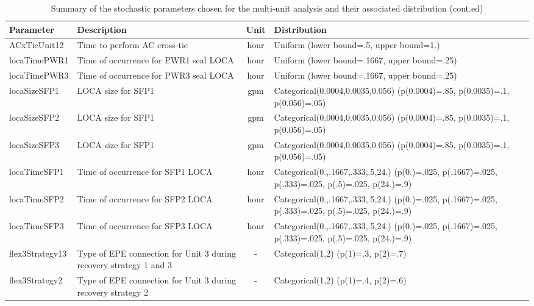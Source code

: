 \begin{table}
  \centering
  \begin{center}
      \begin{tabular}{ | l | p{5cm} | c | p{5cm} |}
        \hline
         \textbf{Parameter}          & \textbf{Description}                      & \textbf{Unit}   & \textbf{Distribution}                                         \\ \hline \hline
         ACxTieUnit12       & Time to perform AC cross-tie     & hour      & Uniform (lower bound=.5, upper bound=1.)             \\ \hline
         locaTimePWR1       & Time of occurrence for PWR1 seal LOCA & hour & Uniform (lower bound=.1667, upper bound=.25)         \\ \hline
         locaTimePWR3       & Time of occurrence for PWR3 seal LOCA & hour & Uniform (lower bound=.1667, upper bound=.25)         \\ \hline
         locaSizeSFP1       & LOCA size for SFP1               & gpm       & Categorical(0.0004,0.0035,0.056) (p(0.0004)=.85, p(0.0035)=.1, p(0.056)=.05)   \\ \hline
         locaSizeSFP2       & LOCA size for SFP1               & gpm       & Categorical(0.0004,0.0035,0.056) (p(0.0004)=.85, p(0.0035)=.1, p(0.056)=.05)   \\ \hline
         locaSizeSFP3       & LOCA size for SFP1               & gpm       & Categorical(0.0004,0.0035,0.056) (p(0.0004)=.85, p(0.0035)=.1, p(0.056)=.05)   \\ \hline    
         locaTimeSFP1       & Time of occurrence for SFP1 LOCA & hour      & Categorical(0.,.1667,.333,.5,24.) (p(0.)=.025, p(.1667)=.025, p(.333)=.025, p(.5)=.025, p(24.)=.9)  \\ \hline
         locaTimeSFP2       & Time of occurrence for SFP2 LOCA & hour      & Categorical(0.,.1667,.333,.5,24.) (p(0.)=.025, p(.1667)=.025, p(.333)=.025, p(.5)=.025, p(24.)=.9)  \\ \hline
         locaTimeSFP3       & Time of occurrence for SFP3 LOCA & hour      & Categorical(0.,.1667,.333,.5,24.) (p(0.)=.025, p(.1667)=.025, p(.333)=.025, p(.5)=.025, p(24.)=.9)  \\ \hline
         flex3Strategy13    & Type of EPE connection for Unit 3 during recovery strategy 1 and 3  & -      & Categorical(1,2) (p(1)=.3, p(2)=.7)             \\ \hline
         flex3Strategy2     & Type of EPE connection for Unit 3 during recovery strategy 2        & -      & Categorical(1,2) (p(1)=.4, p(2)=.6)             \\ 
        \hline
      \end{tabular}
  \end{center}
  \caption{Summary of the stochastic parameters chosen for the multi-unit analysis and their associated distribution (cont.ed)}
  \label{tab:stochasticParameters2}
\end{table}


